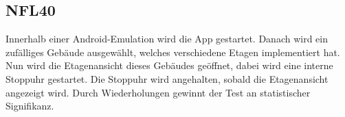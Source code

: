 \subsection*{NFL40}

Innerhalb einer Android-Emulation wird die App gestartet.
Danach wird ein zufälliges Gebäude ausgewählt, welches verschiedene Etagen implementiert hat.
Nun wird die Etagenansicht dieses Gebäudes geöffnet, dabei wird eine interne Stoppuhr gestartet.
Die Stoppuhr wird angehalten, sobald die Etagenansicht angezeigt wird.
Durch Wiederholungen gewinnt der Test an statistischer Signifikanz.